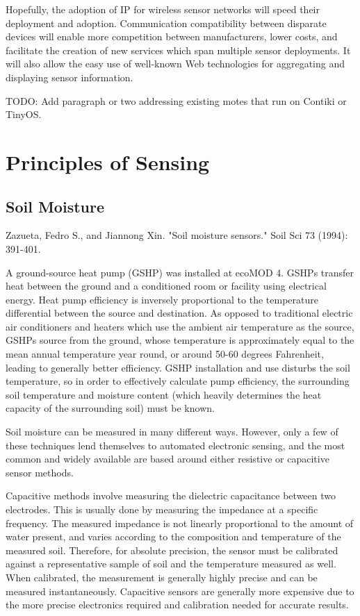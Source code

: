 Hopefully, the adoption of IP for wireless sensor networks will speed their deployment and adoption. Communication compatibility between disparate devices will enable more competition between manufacturers, lower costs, and facilitate the creation of new services which span multiple sensor deployments. It will also allow the easy use of well-known Web technologies for aggregating and displaying sensor information.

TODO: Add paragraph or two addressing existing motes that run on Contiki or TinyOS.

\section{Principles of Sensing}
\subsection{Soil Moisture}

Zazueta, Fedro S., and Jiannong Xin. "Soil moisture sensors." Soil Sci 73 (1994): 391-401.

A ground-source heat pump (GSHP) was installed at ecoMOD 4. GSHPs transfer heat between the ground and a conditioned room or facility using electrical energy. Heat pump efficiency is inversely proportional to the temperature differential between the source and destination. As opposed to traditional electric air conditioners and heaters which use the ambient air temperature as the source, GSHPs source from the ground, whose temperature is approximately equal to the mean annual temperature year round, or around 50-60 degrees Fahrenheit, leading to generally better efficiency. GSHP installation and use disturbs the soil temperature, so in order to effectively calculate pump efficiency, the surrounding soil temperature and moisture content (which heavily determines the heat capacity of the surrounding soil) must be known.

Soil moisture can be measured in many different ways. However, only a few of these techniques lend themselves to automated electronic sensing, and the most common and widely available are based around either resistive or capacitive sensor methods. 

Capacitive methods involve measuring the dielectric capacitance between two electrodes. This is usually done by measuring the impedance at a specific frequency. The measured impedance is not linearly proportional to the amount of water present, and varies according to the composition and temperature of the measured soil. Therefore, for absolute precision, the sensor must be calibrated against a representative sample of soil and the temperature measured as well. When calibrated, the measurement is generally highly precise and can be measured instantaneously. Capacitive sensors are generally more expensive due to the more precise electronics required and calibration needed for accurate results.

